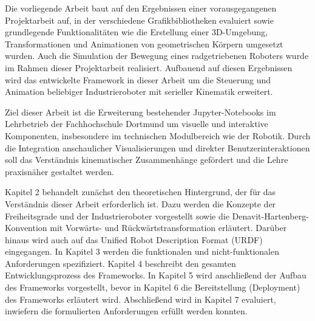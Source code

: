 Die vorliegende Arbeit baut auf den Ergebnissen einer vorausgegangenen Projektarbeit auf,
in der verschiedene Grafikbibliotheken evaluiert sowie grundlegende Funktionalitäten wie die Erstellung einer 3D-Umgebung,
Transformationen und Animationen von geometrischen Körpern umgesetzt wurden. Auch die Simulation der Bewegung eines radgetriebenen Roboters wurde im Rahmen dieser Projektarbeit realisiert.
Aufbauend auf diesen Ergebnissen wird das entwickelte Framework in dieser Arbeit um die Steuerung und Animation beliebiger Industrieroboter mit serieller Kinematik erweitert.

Ziel dieser Arbeit ist die Erweiterung bestehender Jupyter-Notebooks im Lehrbetrieb der Fachhochschule Dortmund um visuelle und interaktive Komponenten, insbesondere im technischen Modulbereich wie der Robotik.
Durch die Integration anschaulicher Visualisierungen und direkter Benutzerinteraktionen soll das Verständnis kinematischer Zusammenhänge gefördert und die Lehre praxisnäher gestaltet werden.


Kapitel 2 behandelt zunächst den theoretischen Hintergrund, der für das Verständnis dieser Arbeit erforderlich ist.
Dazu werden die Konzepte der Freiheitsgrade und der Industrieroboter vorgestellt sowie die Denavit-Hartenberg-Konvention mit Vorwärts- und Rückwärtstransformation erläutert.
Darüber hinaus wird auch auf das Unified Robot Description Format (URDF) eingegangen.
In Kapitel 3 werden die funktionalen und nicht-funktionalen Anforderungen spezifiziert.
Kapitel 4 beschreibt den gesamten Entwicklungsprozess des Frameworks.
In Kapitel 5 wird anschließend der Aufbau des Frameworks vorgestellt, bevor in Kapitel 6 die Bereitstellung (Deployment) des Frameworks erläutert wird.  
Abschließend wird in Kapitel 7 evaluiert, inwiefern die formulierten Anforderungen erfüllt werden konnten.

